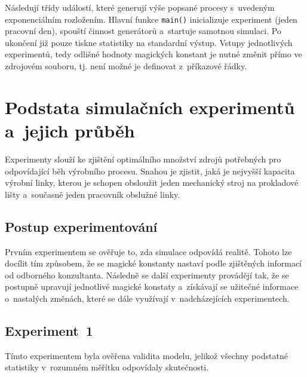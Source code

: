 \documentclass[a4paper, 11pt]{article}
\begin{document}
    Následují třídy událostí, které generují výše popsané procesy s~uvedeným exponenciálním rozložením.
    Hlavní funkce \texttt{main()} inicializuje experiment (jeden pracovní den), spouští činnost generátorů a~startuje samotnou simulaci.
    Po ukončení již pouze tiskne statistiky na standardní výstup.
    Vstupy jednotlivých experimentů, tedy odlišné hodnoty magických konstant je nutné změnit přímo ve zdrojovém souboru, tj. není možné je definovat z~příkazové řádky.

\newpage

\section{Podstata simulačních experimentů a~jejich průběh}
    Experimenty slouží ke zjištění optimálního množství zdrojů potřebných pro odpovídající běh výrobního procesu.
    Snahou je zjistit, jaká je nejvyšší kapacita výrobní linky, kterou je schopen obsloužit jeden mechanický stroj na prokladové lišty a~současně jeden pracovník obslužné linky.

\subsection{Postup experimentování}
    Prvním experimentem se ověřuje to, zda simulace odpovídá realitě.
    Tohoto lze docílit tím způsobem, že se magické konstanty nastaví podle zjištěných informací od odborného konzultanta.
    Následně se další experimenty provádějí tak, že se postupně upravují jednotlivé magické konstaty a~získávají se užitečné informace o~nastalých změnách, které se dále využívají v~nadcházejících experimentech.

\subsection{Experiment~1}
    Tímto experimentem byla ověřena validita modelu, jelikož všechny podstatné statistiky v~rozumném měřítku odpovídaly skutečnosti.
\end{document}
